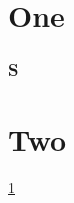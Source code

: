 \documentclass{amsart}
\begin{document}
\part{One}\label{p1}
\section{S}\label{s1}
\part{Two}\label{p2}
\ref{p1} \ref{s1} \ref{p2}
\end{document}
